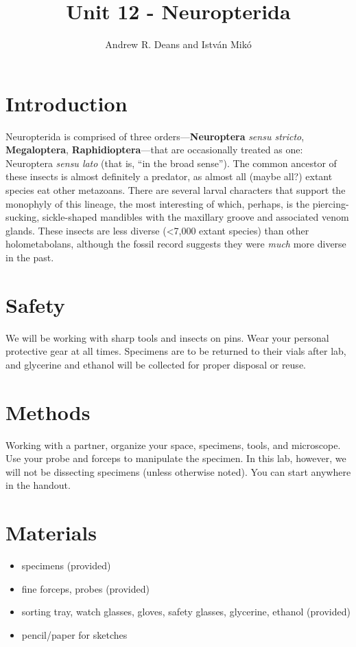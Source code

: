 \documentclass[letterpaper, 11pt]{article}
\title{Unit 12 - Neuropterida}
\author{Andrew R. Deans and Istv\'an Mik\'o}
\begin{document}
\cleanlookdateon %
\maketitle
\thispagestyle{fancy}
\section*{Introduction}
Neuropterida is comprised of three orders---\textbf{Neuroptera} \textit{sensu stricto}, \textbf{Megaloptera}, \textbf{Raphidioptera}---that are occasionally treated as one: Neuroptera \textit{sensu lato} (that is, ``in the broad sense''). The common ancestor of these insects is almost definitely a predator, as almost all (maybe all?) extant species eat other metazoans. There are several larval characters that support the monophyly of this lineage, the most interesting of which, perhaps, is the piercing-sucking, sickle-shaped mandibles with the maxillary groove and associated venom glands. These insects are less diverse (\textless7,000 extant species) than other holometabolans, although the fossil record suggests they were \textit{much} more diverse in the past.

\section*{Safety}
We will be working with sharp tools and insects on pins. Wear your personal protective gear at all times. Specimens are to be returned to their vials after lab, and glycerine and ethanol will be collected for proper disposal or reuse.

\section*{Methods}
Working with a partner, organize your space, specimens, tools, and microscope. Use your probe and forceps to manipulate the specimen. In this lab, however, we will not be dissecting specimens (unless otherwise noted). You can start anywhere in the handout.

\section*{Materials}
\begin{itemize}
\item specimens (provided)
\item fine forceps, probes (provided)
\item sorting tray, watch glasses, gloves, safety glasses, glycerine, ethanol (provided)
\item pencil/paper for sketches
\end{itemize}
\end{document}
